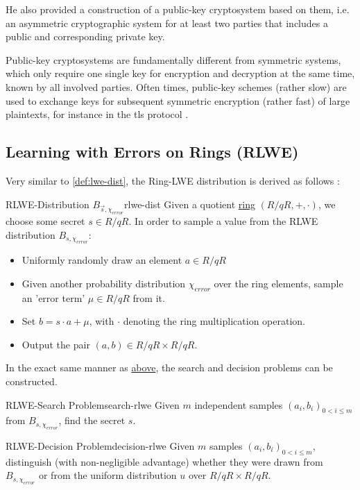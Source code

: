 He also provided a construction of a public-key cryptosystem based on them, i.e. an asymmetric cryptographic system for at least two parties that includes a public and corresponding private key.

Public-key cryptosystems are fundamentally different from symmetric systems, which only require one single key for encryption and decryption at the same time, known by all involved parties.
Often times, public-key schemes (rather slow) are used to exchange keys for subsequent symmetric encryption (rather fast) of large plaintexts, for instance in the \gls{tls} protocol \parencite{rfc8446}.

\subsection{Learning with Errors on Rings (RLWE)}
Very similar to \autoref{def:lwe-dist}, the Ring-LWE distribution is derived as follows \parencite{2010-rlwe-original}:

\begin{corollary}{RLWE-Distribution $B_{\vec{s}, \chi_{error}}$}{rlwe-dist}
  Given a quotient \hyperref[def:ring]{ring} $(R/qR, +, \cdot)$, we choose some secret $s \in R/qR$.
  In order to sample a value from the RLWE distribution $B_{s, \chi_{error}}$:
  \begin{itemize}
    \item Uniformly randomly draw an element $a \in R/qR$
    \item Given another probability distribution $\chi_{error}$ over the ring elements,
          sample an 'error term' $\mu \in R/qR$ from it.
    \item Set $b = s \cdot a + \mu$, with $\cdot$ denoting the ring multiplication operation.
    \item Output the pair $(a, b) \in R/qR \times R/qR$.
  \end{itemize}
\end{corollary}

In the exact same manner as \hyperref[subsec:lwe]{above}, the search and decision problems can be constructed.

\begin{corollary}{RLWE-Search Problem}{search-rlwe}
  Given $m$ independent samples $(a_i, b_i)_{0 < i \leq m}$ from $B_{s, \chi_{error}}$, find the secret $s$.
\end{corollary}
\begin{corollary}{RLWE-Decision Problem}{decision-rlwe}
  Given $m$ samples $(a_i, b_i)_{0 < i \leq m}$, distinguish (with non-negligible advantage)
  whether they were drawn from $B_{s, \chi_{error}}$ or from the uniform distribution
  $u$ over $R/qR \times R/qR$.
\end{corollary}

